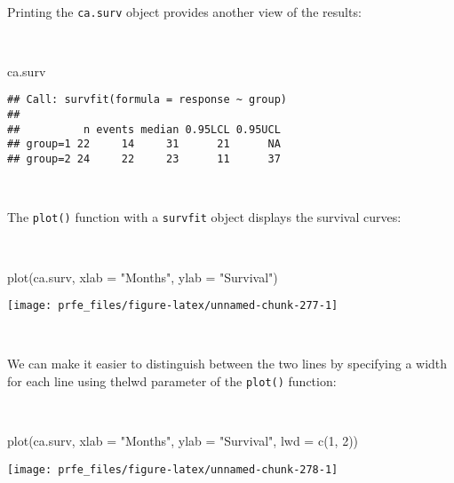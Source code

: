 \documentclass[
  12pt,
  a4paper]{book}
\newenvironment{Shaded}{\begin{snugshade}}{\end{snugshade}}
\newcommand{\AttributeTok}[1]{\textcolor[rgb]{0.77,0.63,0.00}{#1}}
\newcommand{\DecValTok}[1]{\textcolor[rgb]{0.00,0.00,0.81}{#1}}
\newcommand{\FunctionTok}[1]{\textcolor[rgb]{0.00,0.00,0.00}{#1}}
\newcommand{\NormalTok}[1]{#1}
\newcommand{\StringTok}[1]{\textcolor[rgb]{0.31,0.60,0.02}{#1}}
\begin{document}
~

Printing the \texttt{ca.surv} object provides another view of the results:

~

\begin{Shaded}
\begin{Highlighting}[]
\NormalTok{ca.surv}
\end{Highlighting}
\end{Shaded}

\begin{verbatim}
## Call: survfit(formula = response ~ group)
## 
##          n events median 0.95LCL 0.95UCL
## group=1 22     14     31      21      NA
## group=2 24     22     23      11      37
\end{verbatim}

~

The \texttt{plot()} function with a \texttt{survfit} object displays the survival curves:

~

\begin{Shaded}
\begin{Highlighting}[]
\FunctionTok{plot}\NormalTok{(ca.surv, }\AttributeTok{xlab =} \StringTok{"Months"}\NormalTok{, }\AttributeTok{ylab =} \StringTok{"Survival"}\NormalTok{)}
\end{Highlighting}
\end{Shaded}

\begin{center}\texttt{[image: prfe\_files/figure-latex/unnamed-chunk-277-1]} \end{center}

~

We can make it easier to distinguish between the two lines by specifying a width for each line using thelwd
parameter of the \texttt{plot()} function:

~

\begin{Shaded}
\begin{Highlighting}[]
\FunctionTok{plot}\NormalTok{(ca.surv, }\AttributeTok{xlab =} \StringTok{"Months"}\NormalTok{, }\AttributeTok{ylab =} \StringTok{"Survival"}\NormalTok{, }\AttributeTok{lwd =} \FunctionTok{c}\NormalTok{(}\DecValTok{1}\NormalTok{, }\DecValTok{2}\NormalTok{))}
\end{Highlighting}
\end{Shaded}

\begin{center}\texttt{[image: prfe\_files/figure-latex/unnamed-chunk-278-1]} \end{center}
\end{document}
